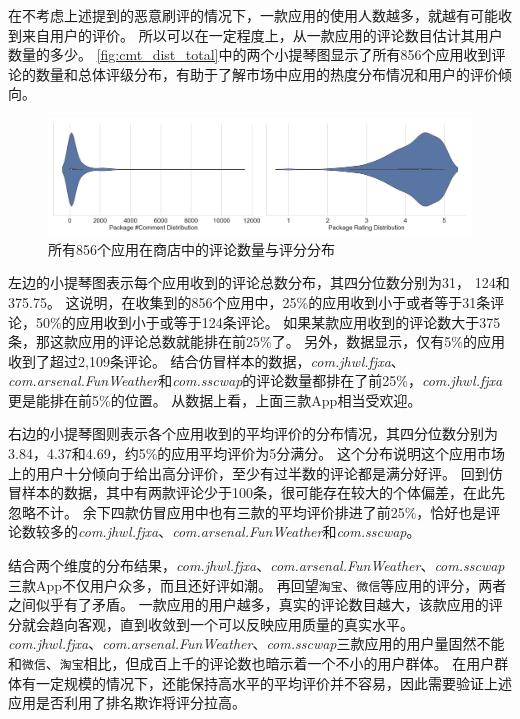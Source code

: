 在不考虑上述提到的恶意刷评的情况下，一款应用的使用人数越多，就越有可能收到来自用户的评价。
所以可以在一定程度上，从一款应用的评论数目估计其用户数量的多少。
\autoref{fig:cmt_dist_total}中的两个小提琴图显示了所有856个应用收到评论的数量和总体评级分布，有助于了解市场中应用的热度分布情况和用户的评价倾向。

%
%
%

\begin{figure}[htbp]
	\centering
	\includegraphics[width=\textwidth]{./Figures/edwin-360-comment-dist.png}
    \caption{所有856个应用在商店中的评论数量与评分分布}
    \label{fig:cmt_dist_total}
\end{figure}

左边的小提琴图表示每个应用收到的评论总数分布，其四分位数分别为31， 124和375.75。
这说明，在收集到的856个应用中，25\%的应用收到小于或者等于31条评论，50\%的应用收到小于或等于124条评论。
如果某款应用收到的评论数大于375条，那这款应用的评论总数就能排在前25\%了。
另外，数据显示，仅有5\%的应用收到了超过2,109条评论。
结合仿冒样本的数据，\emph{com.jhwl.fjxa}、\emph{com.arsenal.FunWeather}和\emph{com.sscwap}的评论数量都排在了前25\%，\emph{com.jhwl.fjxa}更是能排在前5\%的位置。
从数据上看，上面三款App相当受欢迎。

右边的小提琴图则表示各个应用收到的平均评价的分布情况，其四分位数分别为3.84，4.37和4.69，约5\%的应用平均评价为5分满分。
这个分布说明这个应用市场上的用户十分倾向于给出高分评价，至少有过半数的评论都是满分好评。
回到仿冒样本的数据，其中有两款评论少于100条，很可能存在较大的个体偏差，在此先忽略不计。
余下四款仿冒应用中也有三款的平均评价排进了前25\%，恰好也是评论数较多的\emph{com.jhwl.fjxa}、\emph{com.arsenal.FunWeather}和\emph{com.sscwap}。

结合两个维度的分布结果，\emph{com.jhwl.fjxa}、\emph{com.arsenal.FunWeather}、\emph{com.sscwap}三款App不仅用户众多，而且还好评如潮。
再回望\texttt{淘宝}、\texttt{微信}等应用的评分，两者之间似乎有了矛盾。
一款应用的用户越多，真实的评论数目越大，该款应用的评分就会趋向客观，直到收敛到一个可以反映应用质量的真实水平。
\emph{com.jhwl.fjxa}、\emph{com.arsenal.FunWeather}、\emph{com.sscwap}三款应用的用户量固然不能和\texttt{微信}、\texttt{淘宝}相比，但成百上千的评论数也暗示着一个不小的用户群体。
在用户群体有一定规模的情况下，还能保持高水平的平均评价并不容易，因此需要验证上述应用是否利用了排名欺诈将评分拉高。

